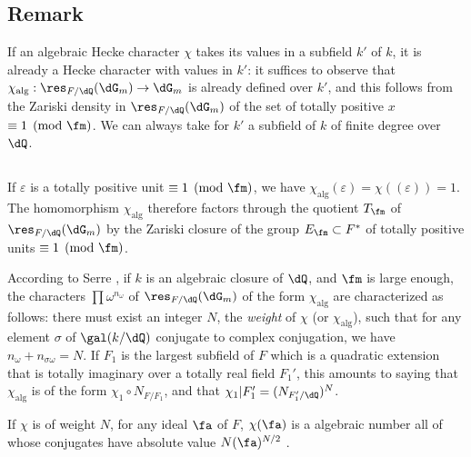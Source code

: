 \subsection{Remark}\label{VI:5-4}

If an algebraic Hecke character $\chi$ takes its values in a 
subfield $k'$ of $k$, it is already a Hecke character with values in 
$k'$: it suffices to observe that $\chi_\text{alg}:\res_{F/\dQ}(\dG_m) \to \dG_m$ 
is already defined over $k'$, and this follows from the Zariski density 
in $\res_{F/\dQ}(\dG_m)$ of the set of totally positive $x$ 
$\equiv 1\pmod\fm$. We can always take for $k'$ a subfield of $k$ of 
finite degree over $\dQ$. 





\subsection{}\label{VI:5-5}

If $\varepsilon$ is a totally positive unit $\equiv 1\pmod\fm$, we have 
$\chi_\text{alg}(\varepsilon) = \chi((\varepsilon)) = 1$. The homomorphism 
$\chi_\text{alg}$ therefore factors through the quotient $T_\fm$ of 
$\res_{F/\dQ}(\dG_m)$ by the Zariski closure of the group 
$E_\fm\subset F^\ast$ of totally positive units $\equiv 1\pmod\fm$. 

According to Serre \cite[II.3]{se68}, if $k$ is an algebraic closure of 
$\dQ$, and $\fm$ is large enough, the characters $\prod \omega^{n_\omega}$ 
of $\res_{F/\dQ}(\dG_m)$ of the form $\chi_\text{alg}$ are characterized 
as follows: there must exist an integer $N$, the \emph{weight} of $\chi$ (or 
$\chi_\text{alg}$), such that for any element $\sigma$ of $\gal(k/\dQ)$ 
conjugate to complex conjugation, we have $n_\omega+n_{\sigma \omega}=N$. If 
$F_1$ is the largest subfield of $F$ which is a quadratic extension 
that is totally imaginary over a totally real field $F_1'$, this amounts to 
  saying that $\chi_\text{alg}$ is of the form $\chi_1\circ N_{F/F_1}$, and that 
  $\chi_1|F_1'=(N_{F_1'/\dQ})^N$. 

If $\chi$ is of weight $N$, for any ideal $\fa$ of $F$, $\chi(\fa)$ is a 
algebraic number all of whose conjugates have absolute value 
$N(\fa)^{N/2}$ \cite[II.3 prop.2]{se68}. 





\subsection{}\label{VI:5-6}

